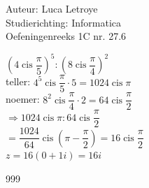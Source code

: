 \documentclass[a4paper]{article}
\begin{document}
\newcommand{\cis}{\operatorname{cis}}
\noindent \large Auteur: Luca Letroye        \\
\noindent \large Studierichting: Informatica \\
\noindent \large Oefeningenreeks 1C nr. 27.6 \\

\medskip

\normalsize

$\left(4\cis \dfrac{\pi}{5} \right)^5 : \left(8\cis \dfrac{\pi}{4} \right)^2 $\\

teller: $4^5 \cis \dfrac{\pi}{5} \cdot 5 = 1024 \cis \pi$\\

noemer: $8^2 \cis \dfrac{\pi}{4} \cdot 2 = 64 \cis \dfrac{\pi}{2}$\\

$\Rightarrow  1024 \cis \pi : 64 \cis \dfrac{\pi}{2}$\\

$ = \dfrac{1024}{64} \cis \left(\pi - \dfrac{\pi}{2}\right) = 16 \cis \dfrac{\pi}{2}$\\

$z = 16(0+1i) = 16i$

\begin{thebibliography}{999}
\end{thebibliography}
\end{document}
